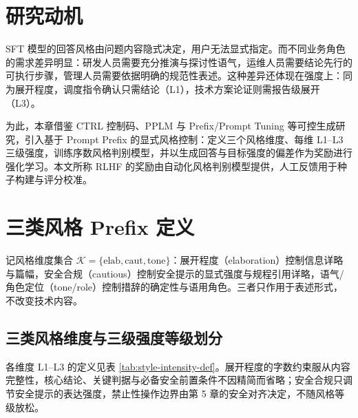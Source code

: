 \documentclass[fontset=fandol,type=master,campus=shenzhen,etitleauto=true]{hithesisbook}
\begin{document}
\section{研究动机}\label{ux7814ux7a76ux52a8ux673a-1}

SFT 模型的回答风格由问题内容隐式决定，用户无法显式指定。而不同业务角色的需求差异明显：研发人员需要充分推演与探讨性语气，运维人员需要结论先行的可执行步骤，管理人员需要依据明确的规范性表述。这种差异还体现在强度上：同为展开程度，调度指令确认只需结论（L1），技术方案论证则需报告级展开（L3）。

为此，本章借鉴 CTRL 控制码、PPLM 与 Prefix/Prompt Tuning 等可控生成研究\cite{ref36,ref37,ref38,ref39}，引入基于 Prompt Prefix 的显式风格控制：定义三个风格维度、每维 L1--L3 三级强度，训练序数风格判别模型，并以生成回答与目标强度的偏差作为奖励进行强化学习。本文所称 RLHF 的奖励由自动化风格判别模型提供，人工反馈用于种子构建与评分校准。

\section{三类风格 Prefix 定义}\label{ux4e09ux7c7bux98ceux683c-prefix-ux5b9aux4e49}

记风格维度集合 $\mathcal{K} = \{\text{elab}, \text{caut}, \text{tone}\}$：展开程度（elaboration）控制信息详略与篇幅，安全合规（cautious）控制安全提示的显式强度与规程引用详略，语气/角色定位（tone/role）控制措辞的确定性与语用角色。三者只作用于表述形式，不改变技术内容。

\subsection{三类风格维度与三级强度等级划分}\label{ux98ceux683cux5f3aux5ea6ux7b49ux7ea7ux5212ux5206}

各维度 L1--L3 的定义见表 \ref{tab:style-intensity-def}。展开程度的字数约束服从内容完整性，核心结论、关键判据与必备安全前置条件不因精简而省略；安全合规只调节安全提示的表达强度，禁止性操作边界由第 5 章的安全对齐决定，不随风格等级放松。
\end{document}
